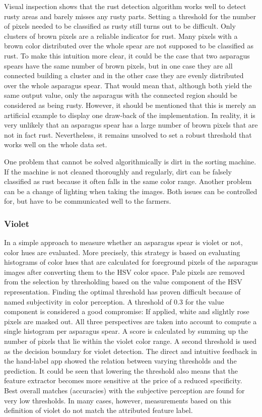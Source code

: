 \bigskip
Visual inspection shows that the rust detection algorithm works well to detect rusty areas and barely misses any rusty parts. Setting a threshold for the number of pixels needed to be classified as rusty still turns out to be difficult. Only clusters of brown pixels are a reliable indicator for rust.  Many pixels with a brown color distributed over the whole spear are not supposed to be classified as rust. To make this intuition more clear, it could be the case that two asparagus spears have the same number of brown pixels, but in one case they are all connected building a cluster and in the other case they are evenly distributed over the whole asparagus spear. That would mean that, although both yield the same output value, only the asparagus with the connected region should be considered as being rusty. However, it should be mentioned that this is merely an artificial example to display one draw-back of the implementation. In reality, it is very unlikely that an asparagus spear has a large number of brown pixels that are not in fact rust. Nevertheless, it remains unsolved to set a robust threshold that works well on the whole data set.

\bigskip
One problem that cannot be solved algorithmically is dirt in the sorting machine. If the machine is not cleaned thoroughly and regularly, dirt can be falsely classified as rust because it often falls in the same color range. Another problem can be a change of lighting when taking the images. Both issues can be controlled for, but have to be communicated well to the farmers.


\subsubsection{Violet}
\label{subsec:Violet}

In a simple approach to measure whether an asparagus spear is violet or not, color hues are evaluated. More precisely, this strategy is based on evaluating histograms of color hues that are calculated for foreground pixels of the asparagus images after converting them to the HSV color space. Pale pixels are removed from the selection by thresholding based on the value component of the HSV representation. Finding the optimal threshold has proven difficult because of named subjectivity in color perception. A threshold of 0.3 for the value component is considered a good compromise: If applied, white and slightly rose pixels are masked out. All three perspectives are taken into account to compute a single histogram per asparagus spear. A score is calculated by summing up the number of pixels that lie within the violet color range. A second threshold is used as the decision boundary for violet detection. The direct and intuitive feedback in the hand-label app showed the relation between varying thresholds and the prediction. It could be seen that lowering the threshold also means that the feature extractor becomes more sensitive at the price of a reduced specificity. Best overall matches (accuracies) with the subjective perception are found for very low thresholds. In many cases, however, measurements based on this definition of violet do not match the attributed feature label.

